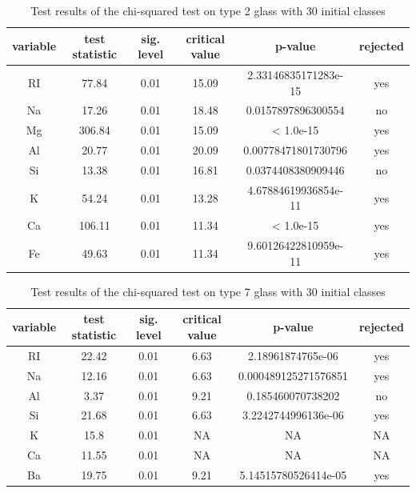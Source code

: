 \documentclass[a4paper, 12pt, titlepage, headsepline, listof = totoc, bibliography = totoc, numbers = noenddot]{scrartcl}
\begin{document}
\begin{appendix}
\begin{table}[h!]
\centering
\begin{tabular}{|cccccc|} \hline variable & test statistic & sig. level & critical value & p-value & rejected\\ \hline RI & 77.84 & 0.01 & 15.09 & 2.33146835171283e-15 & yes\\ 
Na & 17.26 & 0.01 & 18.48 & 0.0157897896300554 & no\\ 
Mg & 306.84 & 0.01 & 15.09 & < 1.0e-15 & yes\\ 
Al & 20.77 & 0.01 & 20.09 & 0.00778471801730796 & yes\\ 
Si & 13.38 & 0.01 & 16.81 & 0.0374408380909446 & no\\ 
K & 54.24 & 0.01 & 13.28 & 4.67884619936854e-11 & yes\\ 
Ca & 106.11 & 0.01 & 11.34 & < 1.0e-15 & yes\\ 
Fe & 49.63 & 0.01 & 11.34 & 9.60126422810959e-11 & yes\\ \hline \end{tabular}\caption{Test results of the chi-squared test on type 2 glass with 30 initial classes}
\label{tab:chi-type2-30}
\end{table}

\begin{table}[h!]
\centering
\begin{tabular}{|cccccc|} \hline variable & test statistic & sig. level & critical value & p-value & rejected\\ \hline RI & 22.42 & 0.01 & 6.63 & 2.18961874765e-06 & yes\\ 
Na & 12.16 & 0.01 & 6.63 & 0.000489125271576851 & yes\\ 
Al & 3.37 & 0.01 & 9.21 & 0.185460070738202 & no\\ 
Si & 21.68 & 0.01 & 6.63 & 3.2242744996136e-06 & yes\\ 
K & 15.8 & 0.01 & NA & NA & NA\\ 
Ca & 11.55 & 0.01 & NA & NA & NA\\ 
Ba & 19.75 & 0.01 & 9.21 & 5.14515780526414e-05 & yes\\ \hline \end{tabular}\caption{Test results of the chi-squared test on type 7 glass with 30 initial classes}
\label{tab:chi-type7-30}
\end{table}


\end{appendix}
\end{document}
